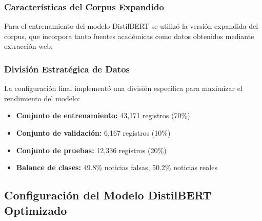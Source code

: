 \subsubsection{Características del Corpus Expandido}

Para el entrenamiento del modelo DistilBERT se utilizó la versión expandida del corpus, que incorpora tanto fuentes académicas como datos obtenidos mediante extracción web:

\begin{table}[htbp]
\centering
{}
\caption{Composición del corpus expandido utilizado para el entrenamiento de DistilBERT.}
\label{tab:corpus_expandido_distilbert}
\end{table}

\subsubsection{División Estratégica de Datos}

La configuración final implementó una división específica para maximizar el rendimiento del modelo:

\begin{itemize}
    \item \textbf{Conjunto de entrenamiento:} 43,171 registros (70\%)
    \item \textbf{Conjunto de validación:} 6,167 registros (10\%)
    \item \textbf{Conjunto de pruebas:} 12,336 registros (20\%)
    \item \textbf{Balance de clases:} 49.8\% noticias falsas, 50.2\% noticias reales
\end{itemize}

\subsection{Configuración del Modelo DistilBERT Optimizado}
\label{subsec:configuracion_distilbert}

